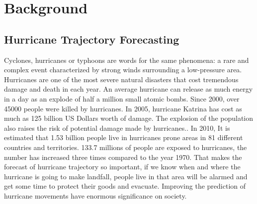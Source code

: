 \chapter{Background}
\label{sec:chapter2}

\section{Hurricane Trajectory Forecasting}
\label{sec:chapter2_1}
Cyclones, hurricanes or typhoons are words for the same phenomena: a rare and complex event characterized by strong winds surrounding a low-pressure area. Hurricanes are one of the most severe natural disasters that cost tremendous damage and death in each year. An average hurricane can release as much energy in a day as an explode of half a million small atomic bombs. Since 2000, over 45000 people were killed by hurricanes. In 2005, hurricane Katrina has cost as much as 125 billion US Dollars worth of damage. The explosion of the population also raises the risk of potential damage made by hurricanes.\cite{peduzzi2012global}. In 2010, It is estimated that 1.53 billion people live in hurricanes prone areas in 81 different countries and territories. 133.7 millions of people are exposed to hurricanes, the number has increased three times compared to the year 1970. That makes the forecast of hurricane trajectory so important, if we know when and where the hurricane is going to make landfall, people live in that area will be alarmed and get some time to protect their goods and evacuate. Improving the prediction of hurricane movements have enormous significance on society.

